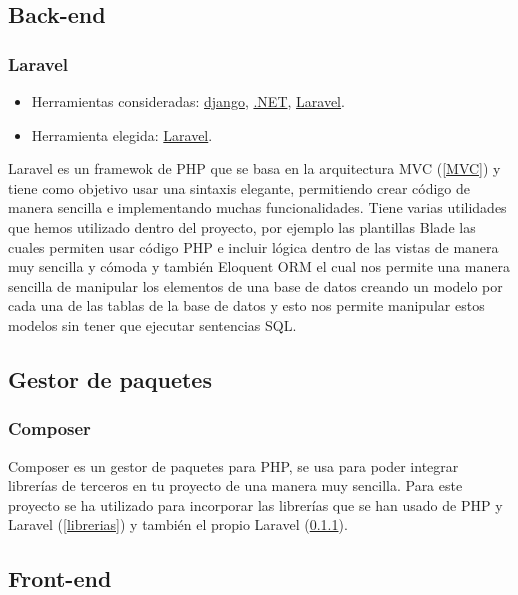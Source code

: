 \subsection{Back-end}

\subsubsection{Laravel}\label{Laravel}
\begin{itemize}
    \item Herramientas consideradas: \href{https://www.djangoproject.com/}{django}, \href{https://docs.microsoft.com/es-es/dotnet/}{.NET}, \href{https://laravel.com/}{Laravel}.
	\item Herramienta elegida: \href{https://laravel.com/}{Laravel}.
\end{itemize}

Laravel es un framewok de PHP que se basa en la arquitectura MVC (\ref{MVC}) y tiene como objetivo usar una sintaxis elegante, permitiendo crear código de manera sencilla e implementando muchas funcionalidades\cite{laravel}. Tiene varias utilidades que hemos utilizado dentro del proyecto, por ejemplo las plantillas Blade las cuales permiten usar código PHP e incluir lógica dentro de las vistas de manera muy sencilla y cómoda y también Eloquent ORM el cual nos permite una manera sencilla de manipular los elementos de una base de datos creando un modelo por cada una de las tablas de la base de datos y esto nos permite manipular estos modelos sin tener que ejecutar sentencias SQL. 

\subsection{Gestor de paquetes}

\subsubsection{Composer}

Composer es un gestor de paquetes para PHP, se usa para poder integrar librerías de terceros en tu proyecto de una manera muy sencilla. Para este proyecto se ha utilizado para incorporar las librerías que se han usado de PHP y Laravel (\ref{librerias}) y también el propio Laravel (\ref{Laravel}).

\subsection{Front-end}

